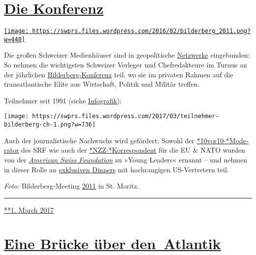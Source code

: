 \hypertarget{die-konferenz}{%
\section{\texorpdfstring{\href{https://swprs.org/2017/03/01/schweizer-medien-bilderberg-konferenz/}{Die
Konferenz}}{Die Konferenz}}\label{die-konferenz}}

\href{https://swprs.org/2017/03/01/schweizer-medien-bilderberg-konferenz/}{\texttt{[image: https://swprs.files.wordpress.com/2016/02/bilderberg\_2011.png?w=440]}}

Die großen Schweizer Medien­­häuser sind in geo­poli­tische
\href{https://swprs.org/netzwerk-medien-schweiz/}{Netz­werke}
ein­ge­bun­den: So nehmen die wichtigsten Schweizer Verleger und
Chef­redakteure im Turnus an der jähr­lichen
\href{http://www.bilderbergmeetings.org/}{Bilderberg-Konferenz} teil, wo
sie im privaten Rahmen auf die trans­atlan­tische Elite aus
Wirt­schaf‌t, Politik und Militär treffen.

Teilnehmer seit 1991 (siehe
\href{https://swprs.org/netzwerk-medien-schweiz/}{Info­grafik}):

\texttt{[image: https://swprs.files.wordpress.com/2017/03/teilnehmer-bilderberg-ch-1.png?w=736]}

Auch der journa­lis­tische Nach­wuchs wird ge­för­dert: Sowohl der
\href{http://www.americanswiss.org/news/arthur-honegger-spotlight/}{*10vor10-*​Mode­ra­tor}
des SRF wie auch der
\href{http://www.americanswiss.org/news/niklaus-nuspliger-spotlight/}{*NZZ-*Korres­pon­dent}
für die EU \& NATO wurden von der
\href{http://www.americanswiss.org/}{\emph{Ameri­can Swiss
Foun­da­tion}} zu »Young Leaders« ernannt -- und neh­men in dieser Rolle
an
\href{http://www.americanswiss.org/ambassador-barras-hosts-dinner-for-young-leaders-1/}{exklu­siven
Dinners} mit hoch­rang­igen US-Ver­tre­tern teil.

\emph{Foto:} Bilder­berg-Meeting
\href{https://www.theguardian.com/world/gallery/2011/jun/15/bilderberg-in-pictures}{2011}
in St. Moritz.

\begin{center}\rule{0.5\linewidth}{\linethickness}\end{center}

\href{https://swprs.org/2017/03/01/schweizer-medien-bilderberg-konferenz/}{**1.
March 2017}

\hypertarget{eine-bruxfccke-uxfcber-den-atlantik}{%
\section{\texorpdfstring{\href{https://swprs.org/2017/03/01/eine-bruecke-ueber-den-atlantik/}{Eine
Brücke über
den~Atlantik}}{Eine Brücke über den~Atlantik}}\label{eine-bruxfccke-uxfcber-den-atlantik}}

